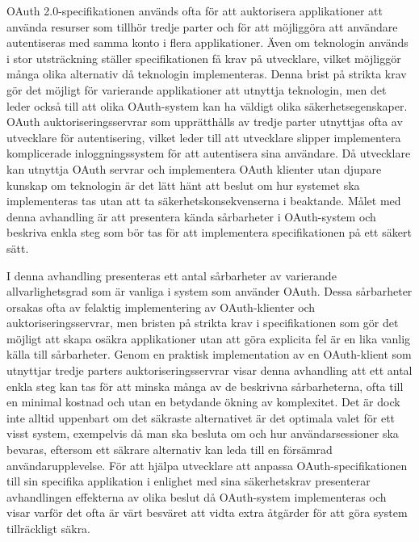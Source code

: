 \newpage

\begin{abstractpage}[swedish]
OAuth 2.0-specifikationen används ofta för att auktorisera applikationer att använda resurser som tillhör tredje parter och för att möjliggöra att användare autentiseras med samma konto i flera applikationer.
Även om teknologin används i stor utsträckning ställer specifikationen få krav på utvecklare, vilket möjliggör många olika alternativ då teknologin implementeras.
Denna brist på strikta krav gör det möjligt för varierande applikationer att utnyttja teknologin, men det leder också till att olika OAuth-system kan ha väldigt olika säkerhetsegenskaper.
OAuth auktoriseringsservrar som upprätthålls av tredje parter utnyttjas ofta av utvecklare för autentisering, vilket leder till att utvecklare slipper implementera komplicerade inloggningssystem för att autentisera sina användare.
Då utvecklare kan utnyttja OAuth servrar och implementera OAuth klienter utan djupare kunskap om teknologin är det lätt hänt att beslut om hur systemet ska implementeras tas utan att ta säkerhetskonsekvenserna i beaktande.
Målet med denna avhandling är att presentera kända sårbarheter i OAuth-system och beskriva enkla steg som bör tas för att implementera specifikationen på ett säkert sätt.

I denna avhandling presenteras ett antal sårbarheter av varierande allvarlighetsgrad som är vanliga i system som använder OAuth.
Dessa sårbarheter orsakas ofta av felaktig implementering av OAuth-klienter och auktoriseringsservrar, men bristen på strikta krav i specifikationen som gör det möjligt att skapa osäkra applikationer utan att göra explicita fel är en lika vanlig källa till sårbarheter.
Genom en praktisk implementation av en OAuth-klient som utnyttjar tredje parters auktoriseringsservrar visar denna avhandling att ett antal enkla steg kan tas för att minska många av de beskrivna sårbarheterna, ofta till en minimal kostnad och utan en betydande ökning av komplexitet.
Det är dock inte alltid uppenbart om det säkraste alternativet är det optimala valet för ett visst system, exempelvis då man ska besluta om och hur användarsessioner ska bevaras, eftersom ett säkrare alternativ kan leda till en försämrad användarupplevelse.
För att hjälpa utvecklare att anpassa OAuth-specifikationen till sin specifika applikation i enlighet med sina säkerhetskrav presenterar avhandlingen effekterna av olika beslut då OAuth-system implementeras och visar varför det ofta är värt besväret att vidta extra åtgärder för att göra system tillräckligt säkra.
\end{abstractpage}
